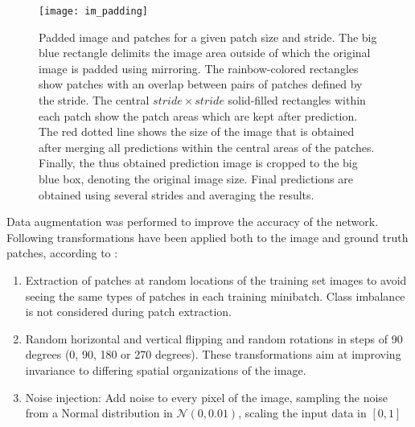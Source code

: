 \documentclass[10pt]{article}
\begin{document}
\begin{figure}[H]
    \centering
    \texttt{[image: im\_padding]}
    \caption{Padded image and patches for a given patch size and stride. The big blue rectangle delimits the image area outside of which the original image is padded using mirroring. The rainbow-colored rectangles show patches with an overlap between pairs of patches defined by the stride. The central $stride \times stride$ solid-filled rectangles within each patch show the patch areas which are kept after prediction. The red dotted line shows the size of the image that is obtained after merging all predictions within the central areas of the patches. Finally, the thus obtained prediction image is cropped to the big blue box, denoting the original image size. Final predictions are obtained using several strides and averaging the results.}
    \label{fig:im_padding}
\end{figure}

Data augmentation was performed to improve the accuracy of the network. Following transformations have been applied both to the image and ground truth patches, according to \textcite{Volpi2017DenseSL}:
\begin{enumerate}
    \item Extraction of patches at random locations of the training set images to avoid seeing the same types of patches in each training minibatch. Class imbalance is not considered during patch extraction.
    \item Random horizontal and vertical flipping and random rotations in steps of 90 degrees (0, 90, 180 or 270 degrees). These transformations aim at improving invariance to differing spatial organizations of the image.
    \item Noise injection: Add noise to every pixel of the image, sampling the noise from a Normal distribution in $\mathcal{N}(0, 0.01)$, scaling the input data in $[0, 1]$
\end{enumerate}
\end{document}
